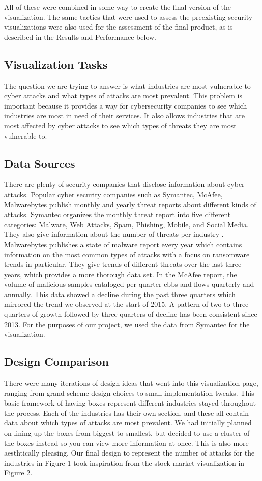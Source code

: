 \documentclass[journal]{vgtc}                %
\begin{document}
All of these were combined in some way to create the final version of the visualization.
The same tactics that were used to assess the preexisting security visualizations were also used for the assessment of the final product, as is described in the Results and Performance below.

\subsection{Visualization Tasks}
The question we are trying to answer is what industries are most vulnerable to cyber attacks and what types of attacks are most prevalent. 
This problem is important because it provides a way for cybersecurity companies to see which industries are most in need of their services. 
It also allows industries that are most affected by cyber attacks to see which types of threats they are most vulnerable to.

\subsection{Data Sources}
There are plenty of security companies that disclose information about cyber attacks. 
Popular cyber security companies such as Symantec, McAfee, Malwarebytes publish monthly and yearly threat reports about different kinds of attacks. 
Symantec organizes the monthly threat report into five different categories: Malware, Web Attacks, Spam, Phishing, Mobile, and Social Media. 
They also give information about the number of threats per industry \cite{SMR}.
Malwarebytes publishes a state of malware report every year which contains information on the most common types of attacks with a focus on ransomware trends in particular. 
They give trends of different threats over the last three years, which provides a more thorough data set. \cite{MWB}
In the McAfee report, the volume of malicious samples cataloged per quarter ebbs and flows quarterly and annually. 
This data showed a decline during the past three quarters which mirrored the trend we observed at the start of 2015. 
A pattern of two to three quarters of growth followed by three quarters of decline has been consistent since 2013. \cite{QT17}
For the purposes of our project, we used the data from Symantec for the visualization.

\subsection{Design Comparison}
There were many iterations of design ideas that went into this visualization page, ranging from grand scheme design choices to small implementation tweaks.
This basic framework of having boxes represent different industries stayed throughout the process.
Each of the industries has their own section, and these all contain data about which types of attacks are most prevalent.
We had initially planned on lining up the boxes from biggest to smallest, but decided to use a cluster of the boxes instead so you can view more information at once.
This is also more aesthtically pleasing.
Our final design to represent the number of attacks for the industries in Figure 1 took inspiration from the stock market visualization in Figure 2.
\end{document}
